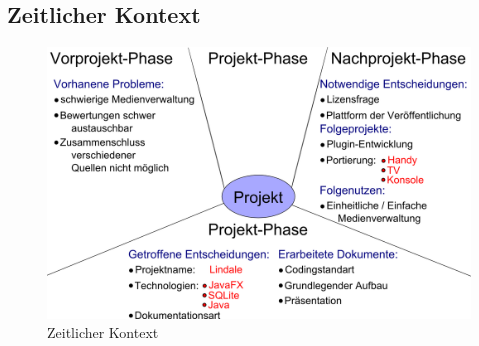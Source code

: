 \subsection{Zeitlicher Kontext}
\begin{figure}[!ht]
\center
\includegraphics[width=\linewidth]{images/zeitlicher-kontext}
\caption{Zeitlicher Kontext}
\end{figure}